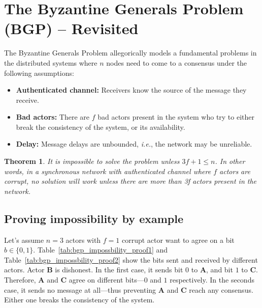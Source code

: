\documentclass[twoside]{article}
\newcounter{lecnum}
\newtheorem{theorem}{Theorem}[lecnum]
\begin{document}
\section{The Byzantine Generals Problem (BGP) -- Revisited}
The Byzantine Generals Problem allegorically models a fundamental problems in the distributed systems where $n$ nodes need to come to a consensus under the following assumptions:

\begin{itemize}
	\item \textbf{Authenticated channel:} Receivers know the source of the message they receive.
	\item \textbf{Bad actors:} There are $f$ bad actors present in the system who try to either break the consistency of the system, or its availability.
	\item \textbf{Delay:} Message delays are unbounded, \textit{i.e.}, the network may be unreliable.
\end{itemize}

\begin{theorem}
	It is impossible to solve the problem unless $3f + 1 \leq n$.
	In other words, in a synchronous network with authenticated channel where $f$ actors are corrupt, no solution will work unless there are more than 3f actors present in the network. 
\end{theorem}

\subsection{Proving impossibility by example}
Let's assume $n=3$ actors with $f=1$ corrupt actor want to agree on a bit $b \in \{0,1\}$.
Table~\ref{tab:bgp_impossbility_proof1} and Table~\ref{tab:bgp_impossbility_proof2} show the bits sent and received by different actors.
Actor \textbf{B} is dishonest.
In the first case, it sends bit $0$ to \textbf{A}, and bit $1$ to \textbf{C}.
Therefore, \textbf{A} and \textbf{C} agree on different bits---$0$ and $1$ respectively.
In the seconds case, it sends no message at all---thus preventing \textbf{A} and \textbf{C} reach any consensus.
Either one breaks the consistency of the system.
\end{document}
